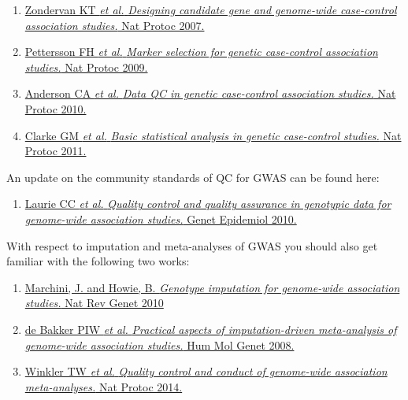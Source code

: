 \documentclass[
]{book}
\providecommand{\tightlist}{%
  \setlength{\itemsep}{0pt}\setlength{\parskip}{0pt}}
\begin{document}
\begin{enumerate}
\def\labelenumi{\arabic{enumi}.}
\tightlist
\item
  \href{https://www.ncbi.nlm.nih.gov/pubmed/17947991}{Zondervan KT \emph{et al.} \emph{Designing candidate gene and genome-wide case-control association studies.} Nat Protoc 2007.}
\item
  \href{https://www.ncbi.nlm.nih.gov/pubmed/19390530}{Pettersson FH \emph{et al.} \emph{Marker selection for genetic case-control association studies.} Nat Protoc 2009.}
\item
  \href{https://www.ncbi.nlm.nih.gov/pubmed/21085122}{Anderson CA \emph{et al.} \emph{Data QC in genetic case-control association studies.} Nat Protoc 2010.}
\item
  \href{https://www.ncbi.nlm.nih.gov/pubmed/21293453}{Clarke GM \emph{et al.} \emph{Basic statistical analysis in genetic case-control studies.} Nat Protoc 2011.}
\end{enumerate}

An update on the community standards of QC for GWAS can be found here:

\begin{enumerate}
\def\labelenumi{\arabic{enumi}.}
\tightlist
\item
  \href{https://www.ncbi.nlm.nih.gov/pubmed/20718045}{Laurie CC \emph{et al.} \emph{Quality control and quality assurance in genotypic data for genome-wide association studies.} Genet Epidemiol 2010.}
\end{enumerate}

With respect to imputation and meta-analyses of GWAS you should also get familiar with the following two works:

\begin{enumerate}
\def\labelenumi{\arabic{enumi}.}
\tightlist
\item
  \href{https://doi.org/10.1038/nrg2796}{Marchini, J. and Howie, B. \emph{Genotype imputation for genome-wide association studies.} Nat Rev Genet 2010}
\item
  \href{https://www.ncbi.nlm.nih.gov/pubmed/18852200}{de Bakker PIW \emph{et al.} \emph{Practical aspects of imputation-driven meta-analysis of genome-wide association studies.} Hum Mol Genet 2008.}
\item
  \href{https://www.ncbi.nlm.nih.gov/pubmed/24762786}{Winkler TW \emph{et al.} \emph{Quality control and conduct of genome-wide association meta-analyses.} Nat Protoc 2014.}
\end{enumerate}
\end{document}
